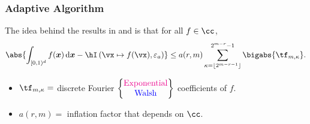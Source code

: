 \documentclass[11pt,compress]{beamer} %
\newcommand{\cube}{[0,1)^d}
\newcommand{\bsx}{\boldsymbol{x}}    %
\newcommand{\D}{{\rm d}}
\DeclareMathOperator{\Var}{Var}
\newcommand{\intalg}{\hI\left(\vx\mapsto f(\vx),\varepsilon_a\right)}
\begin{document}
\begin{frame}
\frametitle{Adaptive Algorithm}
The idea behind the results in  and  is that for all $f\in\cc$,
\[
\abs{\int_{\cube} f(\bsx)\,\D\bsx - \intalg}\leq a(r,m)\sum_{\kappa=\left \lfloor 2^{m-r-1}\right \rfloor}^{2^{m-r}-1} \bigabs{\tf_{m,\kappa}}.
\]
\begin{itemize}
\item $\tf_{m,\kappa}=$ discrete Fourier $\begin{Bmatrix}\textcolor{magenta}{\text{Exponential}}\\\textcolor{blue}{\text{Walsh}}\end{Bmatrix}$ coefficients of $f$.
\item $a(r,m)=$ inflation factor that depends on $\cc$.
\end{itemize}
\end{frame}

\end{document}
